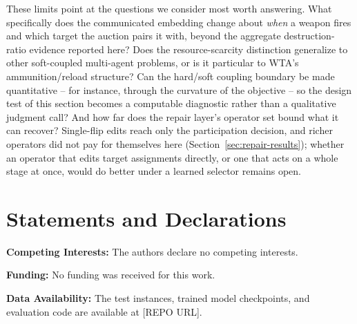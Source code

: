These limits point at the questions we consider most worth answering. What specifically does the communicated embedding change about \emph{when} a weapon fires and which target the auction pairs it with, beyond the aggregate destruction-ratio evidence reported here? Does the resource-scarcity distinction generalize to other soft-coupled multi-agent problems, or is it particular to WTA's ammunition/reload structure? Can the hard/soft coupling boundary be made quantitative -- for instance, through the curvature of the objective -- so the design test of this section becomes a computable diagnostic rather than a qualitative judgment call? And how far does the repair layer's operator set bound what it can recover? Single-flip edits reach only the participation decision, and richer operators did not pay for themselves here (Section~\ref{sec:repair-results}); whether an operator that edits target assignments directly, or one that acts on a whole stage at once, would do better under a learned selector remains open.

\section*{Statements and Declarations}

\textbf{Competing Interests:} The authors declare no competing interests.

\textbf{Funding:} No funding was received for this work.

\textbf{Data Availability:} The test instances, trained model checkpoints, and evaluation code are available at [REPO URL].




